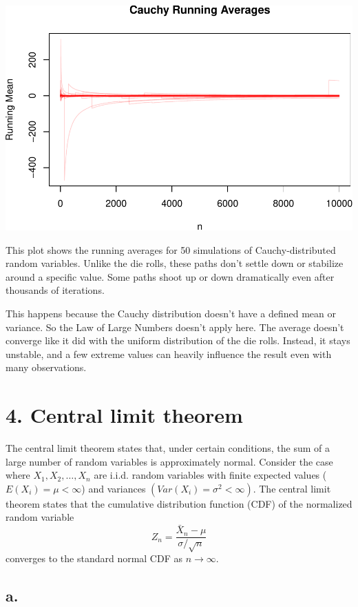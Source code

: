 \documentclass[
]{article}
\begin{document}
\includegraphics{CS1_files/figure-latex/unnamed-chunk-16-1.pdf}

This plot shows the running averages for 50 simulations of
Cauchy-distributed random variables. Unlike the die rolls, these paths
don't settle down or stabilize around a specific value. Some paths shoot
up or down dramatically even after thousands of iterations.

This happens because the Cauchy distribution doesn't have a defined mean
or variance. So the Law of Large Numbers doesn't apply here. The average
doesn't converge like it did with the uniform distribution of the die
rolls. Instead, it stays unstable, and a few extreme values can heavily
influence the result even with many observations.

\section{4. Central limit theorem}\label{central-limit-theorem}

The central limit theorem states that, under certain conditions, the sum
of a large number of random variables is approximately normal. Consider
the case where \(X_1, X_2,\ldots,X_n\) are i.i.d. random variables with
finite expected values (\(E(X_i)=\mu<\infty\)) and variances
\((Var(X_i)=\sigma^2<\infty)\). The central limit theorem states that
the cumulative distribution function (CDF) of the normalized random
variable \[
Z_n = \frac{\bar X_n - \mu}{\sigma/\sqrt{n}}
\] converges to the standard normal CDF as \(n\rightarrow\infty\).

\subsection{a.}\label{a.-3}
\end{document}
